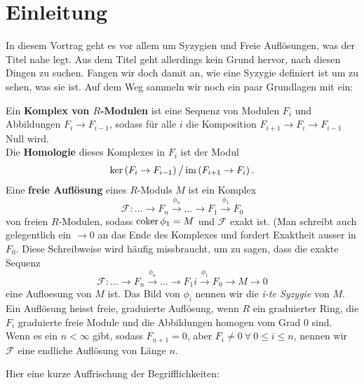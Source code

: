\documentclass{article}
\begin{document}
\maketitle 

\section{Einleitung}
	In diesem Vortrag geht es vor allem um Syzygien und Freie Aufl\"osungen, 
	was der Titel nahe legt.
	Aus dem Titel geht allerdings kein Grund hervor, 
	nach diesen Dingen zu suchen.
	Fangen wir doch damit an, 
	wie eine Syzygie definiert ist um zu sehen,
	was sie ist.
	Auf dem Weg sammeln wir noch ein paar Grundlagen mit ein:
	\begin{defn}
		Ein \textbf{Komplex von \( R \)-Modulen} 
		ist eine Sequenz von Modulen 
		\( F_{i} \)
		und Abbildungen
		\( F_{i} \to F_{i-1} \),
		sodass f\"ur alle 
		\( i \) 
		die Komposition
		\( F_{i+1} \to F_{i} \to F_{i-1} \)
		Null wird. \\
		Die \textbf{Homologie} dieses Komplexes in 
		\( F_{i} \)
		ist der  Modul
		\[
			\ker\left( F_{i} \to F_{i-1 } \right) \big/ 
			\operatorname{im} \left( F_{i+1} \to F_{i} \right).
		\]		
		Eine \textbf{freie Aufl\"osung} eines 
		\(R\)-Moduls 
		\(M\)
		ist ein Komplex
		\[
			\mathcal{F}: \dots \to F_{n} 
			\overset{\phi_{n}}{\to} 
			\dots \to F_{1}
			\overset{\phi_{1}}{\to} F_{0}
		\]
		von freien
		\(R\)-Modulen, sodass 
		\( \operatorname{coker} \phi_{1} = M \)
		und
		\( \mathcal{F} \)
		exakt ist.
		(Man schreibt auch gelegentlich ein 
		\( \to 0 \) 
		an das Ende des Komplexes
		und fordert Exaktheit ausser in 
		\( F_{0} \).
		Diese Schreibweise wird h\"aufig missbraucht,
		um zu sagen, 
		dass die exakte Sequenz
		\[
			\mathcal{F}: \dots \to F_{n} 
			\overset{\phi_{n}}{\to} 
			\dots \to F_{1}i
			\overset{\phi_{1}}{\to} F_{0}
			\to M 
			\to 0
		\]
		eine Aufloesung von 
		\(M \)
		ist.
		Das Bild von
		\( \phi_{i} \)
		nennen wir die
		\emph{i-te Syzygie} 
		von 
		\( M \).\\
		Ein Aufl\"osung heisst freie, graduierte Aufl\"osung,
		wenn 
		\( R \) ein graduierter Ring,
		die 
		\( F_{i} \)
		graduierte freie Module
		und die Abbildungen homogen vom Grad 0 sind.
		Wenn es ein
		\( n < \infty \) 
		gibt, sodass 
		\(F_{n+1}=0 \),
		aber 
		\( F_{i} \neq 0 \ \forall \ 0 \le i \le n \),
		nennen wir 
		\( \mathcal{F} \) 
		eine endliche Aufl\"osung von L\"ange 
		\( n \).
	\end{defn}
	Hier eine kurze Auffrischung der Begrifflichkeiten:
\end{document}
